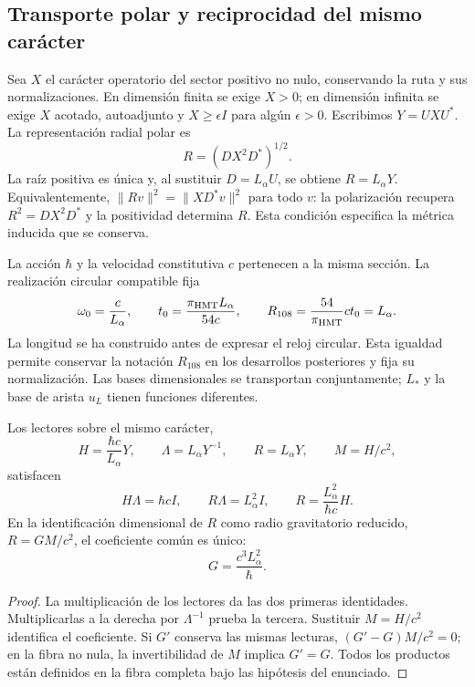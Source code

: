 \subsection{Transporte polar y reciprocidad del mismo carácter}
\label{md:rigidez:polar}

Sea $X$ el carácter operatorio del sector positivo no nulo, conservando la ruta y
sus normalizaciones. En dimensión finita se exige $X>0$; en dimensión
infinita se exige $X$ acotado, autoadjunto y $X\ge\epsilon I$ para algún
$\epsilon>0$. Escribimos $Y=UXU^*$. La representación radial polar es
\[
 R=(DX^2D^*)^{1/2}.
\]
La raíz positiva es única y, al sustituir $D=L_\alpha U$, se obtiene
$R=L_\alpha Y$. Equivalentemente,
$\|Rv\|^2=\|XD^*v\|^2$ para todo $v$: la polarización recupera
$R^2=DX^2D^*$ y la positividad determina $R$. Esta condición especifica
la métrica inducida que se conserva.

La acción $\hbar$ y la velocidad constitutiva $c$ pertenecen a la misma
sección. La realización circular compatible fija
\begin{equation}
 \omega_0=\frac{c}{L_\alpha},\qquad
 t_0=\frac{\pi_{\rm HMT}L_\alpha}{54c},\qquad
 R_{108}=\frac{54}{\pi_{\rm HMT}}ct_0=L_\alpha.
 \label{md:rigidez:reloj}
\end{equation}
La longitud se ha construido antes de expresar el reloj circular. Esta
igualdad permite conservar la notación $R_{108}$ en los desarrollos
posteriores y fija su normalización. Las bases dimensionales se transportan
conjuntamente; $L_*$ y la base de arista $u_L$ tienen funciones diferentes.

\begin{theorem}
\label{md:rigidez:teorema}
Los lectores sobre el mismo carácter,
\[
 H=\frac{\hbar c}{L_\alpha}Y,\qquad
 \Lambda=L_\alpha Y^{-1},\qquad R=L_\alpha Y,\qquad M=H/c^2,
\]
satisfacen
\begin{equation}
 H\Lambda=\hbar cI,\qquad R\Lambda=L_\alpha^2I,\qquad
 R=\frac{L_\alpha^2}{\hbar c}H.
 \label{md:rigidez:identidades}
\end{equation}
En la identificación dimensional de $R$ como radio gravitatorio reducido,
$R=GM/c^2$, el coeficiente común es único:
\begin{equation}
 \boxed{G=\frac{c^3L_\alpha^2}{\hbar}.}
 \label{md:rigidez:G}
\end{equation}
\end{theorem}
\begin{proof}
La multiplicación de los lectores da las dos primeras identidades.
Multiplicarlas a la derecha por $\Lambda^{-1}$ prueba la tercera.
Sustituir $M=H/c^2$ identifica el coeficiente. Si $G'$ conserva las mismas
lecturas, $(G'-G)M/c^2=0$; en la fibra no nula, la invertibilidad de $M$
implica $G'=G$.
Todos los productos están definidos en la fibra completa bajo las
hipótesis del enunciado.
\end{proof}

